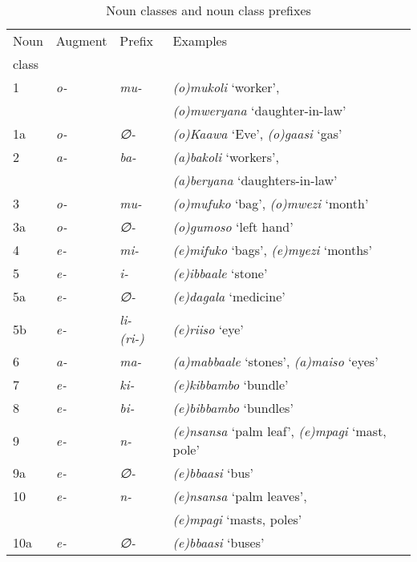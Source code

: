 \begin{table}
\caption{Noun classes and noun class prefixes}\label{tab-NC-morphology}
\begin{tabularx}{\textwidth}{X l X l }
\lsptoprule
 
Noun & Augment & Prefix & Examples\\
class &  &  & \\
\midrule
1	& \textit{o-} & \textit{mu-} &  \textit{(o)mukoli} `worker',\\
	 & 		& 		 & 	\textit{(o)mweryana} `daughter-in-law'\\
1a	& \textit{o-} & \textit{∅-} & \textit{(o)Kaawa} `Eve', \textit{(o)gaasi} `gas'\\

2	& \textit{a-} & \textit{ba-} & \textit{(a)bakoli} `workers',\\
	& 	& 	& 		\textit{(a)beryana} `daughters-in-law'\\

3 & \textit{o-} & \textit{mu-} &  \textit{(o)mufuko} `bag', \textit{(o)mwezi} `month'\\
3a & \textit{o-} & \textit{∅-}  &  \textit{(o)gumoso} `left hand'\\
4 & \textit{e-} & \textit{mi-} &  \textit{(e)mifuko} `bags', \textit{(e)myezi} `months'\\

5 & \textit{e-} & \textit{i-} & \textit{(e)ibbaale} `stone'\\
5a & \textit{e-} & \textit{∅-} &  \textit{(e)dagala} `medicine'\\
5b & \textit{e-} & \textit{li- (ri-)} &  \textit{(e)riiso} `eye'\\
6 & \textit{a-} & \textit{ma-} &  \textit{(a)mabbaale} `stones', \textit{(a)maiso} `eyes'\\
7 & \textit{e-} & \textit{ki-} & \textit{(e)kibbambo} `bundle'\\
8 & \textit{e-} & \textit{bi-} &    \textit{(e)bibbambo} `bundles'\\

9 & \textit{e-}	& \textit{n-}	& 	 \textit{(e)nsansa} `palm leaf',  \textit{(e)mpagi} `mast, pole'\\
9a & \textit{e-}	& \textit{∅-} 	&   \textit{(e)bbaasi} `bus'\\
10 & \textit{e-}	& \textit{n-}	&  \textit{(e)nsansa} `palm leaves', \\
 	& 		& 			&  \textit{(e)mpagi} `masts, poles'\\
10a & \textit{e-} & \textit{∅-} &   \textit{(e)bbaasi} `buses'\\ 


\end{tabularx}
\end{table}
